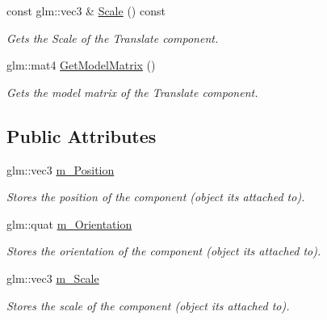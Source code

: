 \begin{DoxyCompactItemize}
const glm\+::vec3 \& \mbox{\hyperlink{class_transform_component_af4c4f5e4e950d6d67eebd13a708ca23a}{Scale}} () const
\begin{DoxyCompactList}\small\item\em Gets the Scale of the Translate component. \end{DoxyCompactList}\item 
glm\+::mat4 \mbox{\hyperlink{class_transform_component_ac1c08a7a1c23be62f1de1718ee783922}{Get\+Model\+Matrix}} ()
\begin{DoxyCompactList}\small\item\em Gets the model matrix of the Translate component. \end{DoxyCompactList}\end{DoxyCompactItemize}
\subsection*{Public Attributes}
\begin{DoxyCompactItemize}
\item 
\mbox{\label{class_transform_component_a596b1336cbf060d6161279e1d7821ab6}} 
glm\+::vec3 \mbox{\hyperlink{class_transform_component_a596b1336cbf060d6161279e1d7821ab6}{m\+\_\+\+Position}}
\begin{DoxyCompactList}\small\item\em Stores the position of the component (object it\textquotesingle{}s attached to). \end{DoxyCompactList}\item 
\mbox{\label{class_transform_component_aaf1c93401825078df6f85d8f2f184462}} 
glm\+::quat \mbox{\hyperlink{class_transform_component_aaf1c93401825078df6f85d8f2f184462}{m\+\_\+\+Orientation}}
\begin{DoxyCompactList}\small\item\em Stores the orientation of the component (object it\textquotesingle{}s attached to). \end{DoxyCompactList}\item 
\mbox{\label{class_transform_component_aeef2b7cdd336afb4d86f13f592a0defa}} 
glm\+::vec3 \mbox{\hyperlink{class_transform_component_aeef2b7cdd336afb4d86f13f592a0defa}{m\+\_\+\+Scale}}
\begin{DoxyCompactList}\small\item\em Stores the scale of the component (object it\textquotesingle{}s attached to). \end{DoxyCompactList}\end{DoxyCompactItemize}


